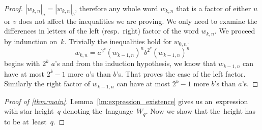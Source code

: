 \begin{proof}
    $|w_{k,n}|_a = |w_{k,n}|_b$, therefore any whole word $w_{k,n}$ that is a factor of either $u$ or $v$ does not affect the inequalities we are proving. We only need to examine the differences in letters of the left (resp.~right) factor of the word $w_{k,n}$. We proceed by indunction on~$k$. Trivially the inequalities hold for $w_{0,n}$.
    \[
        w_{k,n} = a^{2^k}{(w_{k-1,n})}^{n}b^{2^k}{(w_{k-1,n})}^{n}
    \] begins with $2^k$ $a$'s and from the induction hypothesis, we know that $w_{k-1,n}$ can have at most $2^k-1$ more $a$'s than $b$'s. That proves the case of the left factor.
    Similarly the right factor of $w_{k-1,n}$ can have at most $2^k-1$ more $b$'s than $a$'s.
\end{proof}

\begin{proof}[Proof of \autoref*{thm:main}]
    Lemma~\ref*{lm:expression_existence} gives us an~expression with star height~$q$ denoting the~language~$W_q$. Now we show that the~height has to be at~least~$q$. 
\end{proof}